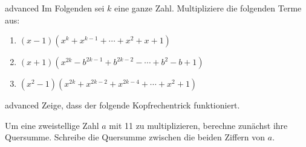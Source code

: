 \documentclass[../variablen.tex]{subfiles}
\begin{document}
\begin{exercise}{advanced}
    Im Folgenden sei $k$ eine ganze Zahl. Multipliziere die folgenden Terme aus:
    \begin{enumerate}
        \item $(x-1)(x^k+x^{k-1}+\cdots+x^2+x+1)$
        \item $(x+1)(x^{2k}-b^{2k-1}+b^{2k-2}-\cdots+b^2-b+1)$
        \item $(x^2-1)(x^{2k}+x^{2k-2}+x^{2k-4}+\cdots+x^2+1)$
    \end{enumerate}
\end{exercise}

\begin{exercise}{advanced}
    Zeige, dass der folgende Kopfrechentrick funktioniert.

    Um eine zweistellige Zahl $a$ mit 11 zu multiplizieren, berechne zunächst ihre Quersumme. Schreibe die Quersumme zwischen die beiden Ziffern von $a$.
\end{exercise}
\end{document}
